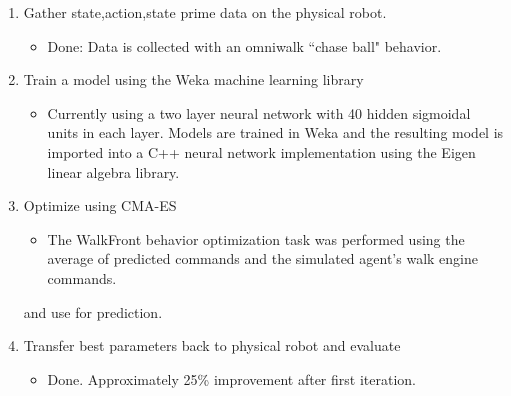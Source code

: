 \documentclass[12 pt]{article}
\begin{document}
\begin{enumerate}



\item Gather state,action,state prime data on the physical robot.
\begin{itemize}
\item Done: Data is collected with an omniwalk ``chase ball" behavior.
\end{itemize}

\item Train a model using the Weka machine learning library
\begin{itemize}
\item Currently using a two layer neural network with 40 hidden sigmoidal units in each layer. Models are trained in Weka and the resulting model is imported into a C++ neural network implementation using the Eigen linear algebra library.
\end{itemize}

\item Optimize using CMA-ES
\begin{itemize}
\item The WalkFront behavior optimization task was performed using the average of predicted commands and the simulated agent's walk engine commands.
\end{itemize}and use for prediction.

\item Transfer best parameters back to physical robot and evaluate
\begin{itemize}
\item Done. Approximately 25\% improvement after first iteration. 
\end{itemize}

\end{enumerate}
\end{document}
